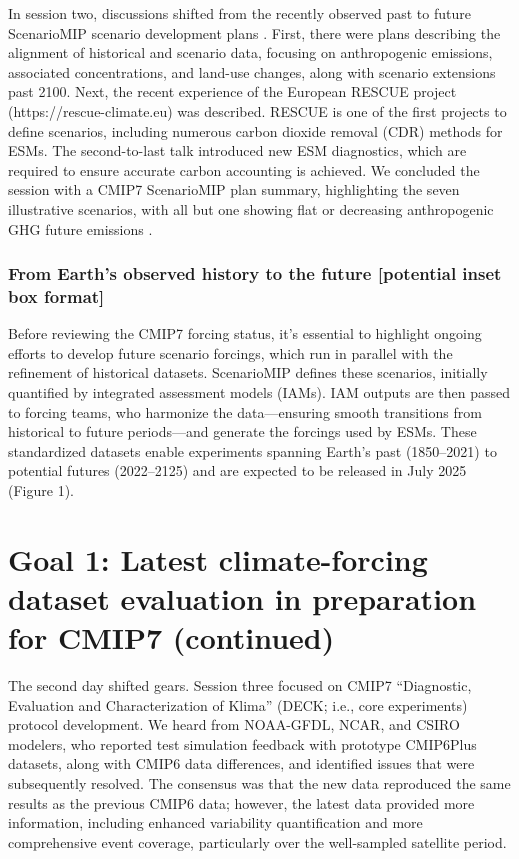 \documentclass{ametsocV6.1}
\begin{document}
In session two, discussions shifted from the recently observed past to future ScenarioMIP scenario development plans \citep{van_vuuren_scenario_2025}. First, there were plans describing the alignment of historical and scenario data, focusing on anthropogenic emissions, associated concentrations, and land-use changes, along with scenario extensions past 2100. Next, the recent experience of the European RESCUE project (https://rescue-climate.eu) was described. RESCUE is one of the first projects to define scenarios, including numerous carbon dioxide removal (CDR) methods for ESMs. The second-to-last talk introduced new ESM diagnostics, which are required to ensure accurate carbon accounting is achieved. We concluded the session with a CMIP7 ScenarioMIP plan summary, highlighting the seven illustrative scenarios, with all but one showing flat or decreasing anthropogenic GHG future emissions \citep{van_vuuren_scenario_2025}.

\subsubsection*{From Earth’s observed history to the future [potential inset box format]}
Before reviewing the CMIP7 forcing status, it's essential to highlight ongoing efforts to develop future scenario forcings, which run in parallel with the refinement of historical datasets. ScenarioMIP \citep{van_vuuren_scenario_2025} defines these scenarios, initially quantified by integrated assessment models (IAMs). IAM outputs are then passed to forcing teams, who harmonize the data—ensuring smooth transitions from historical to future periods—and generate the forcings used by ESMs. These standardized datasets enable experiments spanning Earth’s past (1850–2021) to potential futures (2022–2125) and are expected to be released in July 2025 (Figure 1).

\section*{Goal 1: Latest climate-forcing dataset evaluation in preparation for CMIP7 (continued)}
The second day shifted gears. Session three focused on CMIP7 ``Diagnostic, Evaluation and Characterization of Klima'' (DECK; i.e., core experiments) protocol development. We heard from NOAA-GFDL, NCAR, and CSIRO modelers, who reported test simulation feedback with prototype CMIP6Plus datasets, along with CMIP6 data differences, and identified issues that were subsequently resolved. The consensus was that the new data reproduced the same results as the previous CMIP6 data; however, the latest data provided more information, including enhanced variability quantification and more comprehensive event coverage, particularly over the well-sampled satellite period.
\end{document}
